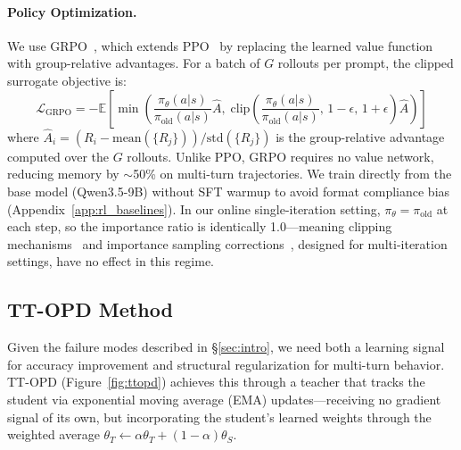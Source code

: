 \documentclass{article}
\begin{document}
\paragraph{Policy Optimization.}
We use GRPO~\citep{shao2024deepseekmath}, which extends PPO~\citep{schulman2017ppo} by replacing the learned value function with group-relative advantages. For a batch of $G$ rollouts per prompt, the clipped surrogate objective is:
\begin{equation}
    \mathcal{L}_{\text{GRPO}} = -\mathbb{E}\left[\min\!\left(\frac{\pi_\theta(a|s)}{\pi_{\text{old}}(a|s)}\hat{A},\; \text{clip}\!\left(\frac{\pi_\theta(a|s)}{\pi_{\text{old}}(a|s)},\, 1{-}\epsilon,\, 1{+}\epsilon\right)\hat{A}\right)\right]
\label{eq:grpo}
\end{equation}
where $\hat{A}_i = (R_i - \text{mean}(\{R_j\}))/\text{std}(\{R_j\})$ is the group-relative advantage computed over the $G$ rollouts. Unlike PPO, GRPO requires no value network, reducing memory by $\sim$50\% on multi-turn trajectories. We train directly from the base model (Qwen3.5-9B) without SFT warmup to avoid format compliance bias (Appendix~\ref{app:rl_baselines}). In our online single-iteration setting, $\pi_\theta = \pi_\text{old}$ at each step, so the importance ratio is identically 1.0---meaning clipping mechanisms~\citep{dapo2025} and importance sampling corrections~\citep{gspo2025}, designed for multi-iteration settings, have no effect in this regime.

\subsection{TT-OPD Method}
\label{sec:opd}

Given the failure modes described in \S\ref{sec:intro}, we need both a learning signal for accuracy improvement and structural regularization for multi-turn behavior. TT-OPD (Figure~\ref{fig:ttopd}) achieves this through a teacher that tracks the student via exponential moving average (EMA) updates---receiving no gradient signal of its own, but incorporating the student's learned weights through the weighted average $\theta_T \leftarrow \alpha\theta_T + (1{-}\alpha)\theta_S$.
\end{document}
